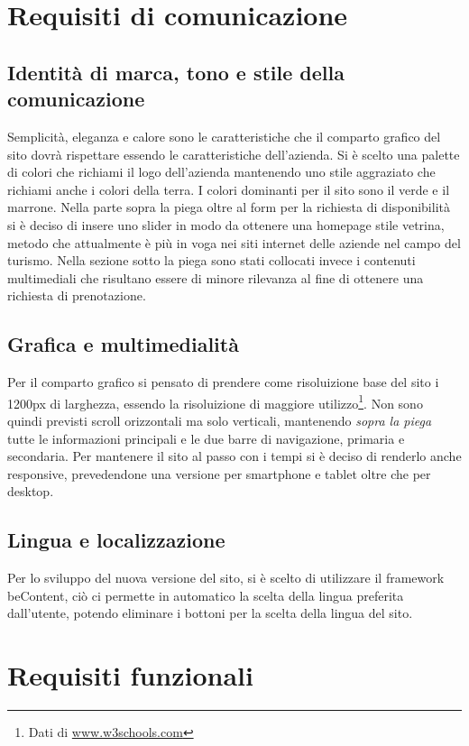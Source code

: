 \documentclass[a4paper,12pt,hidelinks]{report}
\begin{document}
  \section{Requisiti di comunicazione}
  \subsection{Identità di marca, tono e stile della comunicazione}
  Semplicità, eleganza e calore sono le caratteristiche che il comparto grafico del sito dovrà rispettare essendo le caratteristiche dell'azienda. 
  Si è scelto una palette di colori che richiami il logo dell'azienda mantenendo uno stile aggraziato che richiami anche i colori della terra. I colori dominanti per il sito
  sono il verde e il marrone. Nella parte sopra la piega oltre al form per la richiesta di disponibilità si è deciso di insere uno slider in modo da ottenere una homepage
  stile vetrina, metodo che attualmente è più in voga nei siti internet delle aziende nel campo del turismo. Nella sezione sotto la piega sono stati collocati invece i contenuti multimediali
  che risultano essere di minore rilevanza al fine di ottenere una richiesta di prenotazione.

  \subsection{Grafica e multimedialità}
  Per il comparto grafico si pensato di prendere come risoluizione base del sito i 1200px di larghezza, essendo la risoluizione di maggiore utilizzo\footnote{Dati di \url{www.w3schools.com}}.
  Non sono quindi previsti scroll orizzontali ma solo verticali, mantenendo \textit{sopra la piega} tutte le informazioni principali e le due barre di navigazione, primaria e secondaria. Per mantenere
  il sito al passo con i tempi si è deciso di renderlo anche responsive, prevedendone una versione per smartphone e tablet oltre che per desktop.
  \subsection{Lingua e localizzazione}
  Per lo sviluppo del nuova versione del sito, si è scelto di utilizzare il framework beContent, ciò ci permette in automatico la scelta della lingua preferita dall'utente, potendo eliminare i bottoni per la 
  scelta della lingua del sito. 

\section{Requisiti funzionali}
\end{document}
